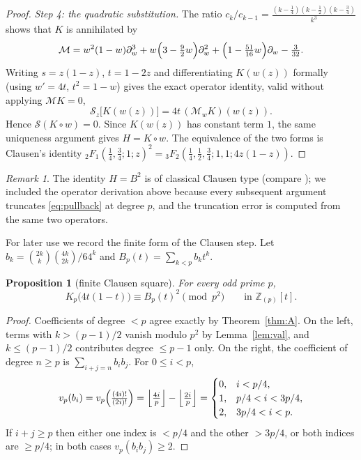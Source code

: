 \documentclass[11pt]{amsart}
\newtheorem{proposition}[theorem]{Proposition}
\theoremstyle{definition}
\theoremstyle{remark}
\newtheorem{remark}[theorem]{Remark}
\newcommand{\Zp}{\mathbb{Z}_{(p)}}
\newcommand{\fl}[1]{\left\lfloor #1 \right\rfloor}
\begin{document}
\begin{proof}
\emph{Step 4: the quadratic substitution.}
The ratio $c_k/c_{k-1}=\frac{(k-\frac14)(k-\frac12)(k-\frac34)}{k^3}$
shows that $K$ is annihilated by
\[
\mathcal M=w^2(1-w)\partial_w^3+w\Bigl(3-\tfrac92w\Bigr)\partial_w^2
+\Bigl(1-\tfrac{51}{16}w\Bigr)\partial_w-\tfrac3{32}.
\]
Writing $s=z(1-z)$, $t=1-2z$ and differentiating
$K(w(z))$ formally (using $w'=4t$, $t^2=1-w$) gives the exact
operator identity, valid without applying $\mathcal MK=0$,
\begin{equation}\label{eq:pullback}
\mathcal S_z\bigl[K(w(z))\bigr]=4t\,(\mathcal M_wK)(w(z)).
\end{equation}
Hence $\mathcal S(K\circ w)=0$. Since $K(w(z))$ has constant term $1$,
the same uniqueness argument gives $H=K\circ w$. The equivalence of the
two forms is Clausen's identity
${}_2F_1(\frac14,\frac34;1;z)^2
={}_3F_2(\frac14,\frac12,\frac34;1,1;4z(1-z))$.
\end{proof}

\begin{remark}
The identity $H=B^2$ is of classical Clausen type
(compare \cite{CTYZ}); we included the operator derivation above because
every subsequent argument truncates \eqref{eq:pullback} at degree $p$,
and the truncation error is computed from the same two operators.
\end{remark}

For later use we record the finite form of the Clausen step. Let
$b_k=\binom{2k}{k}\binom{4k}{2k}/64^k$ and
$B_p(t)=\sum_{k<p}b_kt^k$.

\begin{proposition}[finite Clausen square]\label{prop:fclausen}
For every odd prime $p$,
\[
K_p\bigl(4t(1-t)\bigr)\equiv B_p(t)^2\pmod{p^2}
\qquad\text{in }\Zp[t].
\]
\end{proposition}

\begin{proof}
Coefficients of degree $<p$ agree exactly by Theorem~\ref{thm:A}.
On the left, terms with $k>(p-1)/2$ vanish modulo $p^2$ by
Lemma~\ref{lem:val}, and $k\le(p-1)/2$ contributes degree $\le p-1$
only. On the right, the coefficient of degree $n\ge p$ is
$\sum_{i+j=n}b_ib_j$. For $0\le i<p$,
\[
v_p(b_i)=v_p\Bigl(\tfrac{(4i)!}{(2i)!}\Bigr)=\fl{\tfrac{4i}{p}}-\fl{\tfrac{2i}{p}}
=\begin{cases}0,&i<p/4,\\1,&p/4<i<3p/4,\\2,&3p/4<i<p.\end{cases}
\]
If $i+j\ge p$ then either one index is $<p/4$ and the other $>3p/4$, or
both indices are $\ge p/4$; in both cases $v_p(b_ib_j)\ge2$.
\end{proof}
\end{document}
